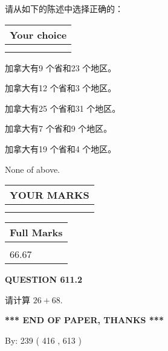 \documentclass{ctexart}
\begin{document}
  
请从如下的陈述中选择正确的：
  
  
\noindent\hspace{3.0in} \begin{tabular}{|l|}
\hline
Your choice \\
\hline
 \\ 
 \\ 
\hline
\end{tabular}
  
  
 
 
加拿大有9 个省和23 个地区。
 
 
加拿大有12 个省和3 个地区。
 
 
加拿大有25 个省和31 个地区。
 
 
加拿大有7 个省和9 个地区。
 
 
加拿大有19 个省和4 个地区。
 
 
 None of above.
 
 
  
\vspace{0.2in}
  
\noindent\begin{tabular}{|l|}
\hline
 YOUR MARKS  \\
\hline
 \\ 
 \\ 
\hline
\end{tabular}
\hspace{0.05in} \begin{tabular}{|l|}
\hline
 Full Marks  \\
\hline
 \\ 
66.67 \\
\hline
\end{tabular}
{\textbf{\Large{QUESTION
611.2 
}}}
  
  
 
请计算 $ %
26 +  %
68 $.
 

 

 
   
   
 \vspace{0.2in}
 
   
   
   
   
\vspace{1.0in} 
{\textbf{\large{ *** END OF PAPER, THANKS *** }}} 
   
   
\hspace{1.0in} By: 
 239 ( 416 ,  613 )
   
\end{document}
